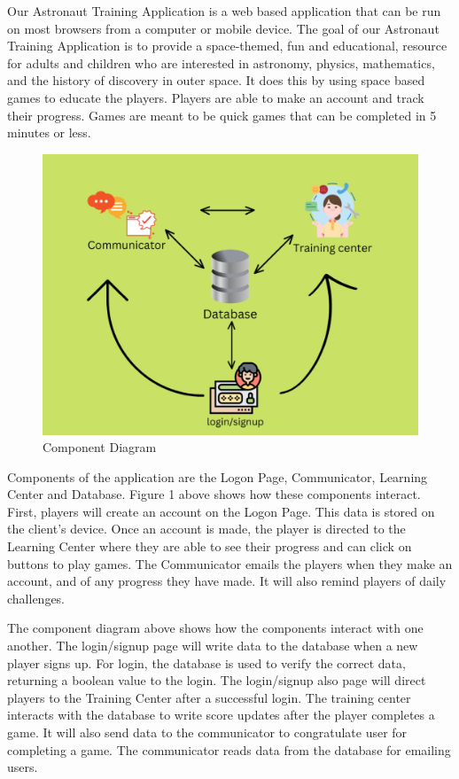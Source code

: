 \documentclass[12pt]{article}
\begin{document}
    Our Astronaut Training Application is a web based application that can be run on most browsers from a computer or mobile device.  The goal of our Astronaut Training Application is to provide a space-themed, fun and educational, resource for adults and children who are interested in astronomy, physics, mathematics, and the history of discovery in outer space. It does this by using space based games to educate the players.  Players are able to make an account and track their progress.  Games are meant to be quick games that can be completed in 5 minutes or less.

    \begin{figure}[ht]
        \centering
            \includegraphics[height=0.3\textheight]{ComponentDiagram.jpg}
            \caption{Component Diagram}
    \end{figure}
    
    Components of the application are the Logon Page, Communicator, Learning Center and Database.  Figure 1 above shows how these components interact.  First, players will create an account on the Logon Page.  This data is stored on the client's device.  Once an account is made, the player is directed to the Learning Center where they are able to see their progress and can click on buttons to play games. The Communicator emails the players when they make an account, and of any progress they have made.  It will also remind players of daily challenges.

    The component diagram above shows how the components interact with one another.  The login/signup page will write data to the database when a new player signs up.  For login, the database is used to verify the correct data, returning a boolean value to the login.  The login/signup also page will direct players to the Training Center after a successful login.  The training center interacts with the database to write score updates after the player completes a game.  It will also send data to the communicator to congratulate user for completing a game. The communicator reads data from the database for emailing users.  
\end{document}
